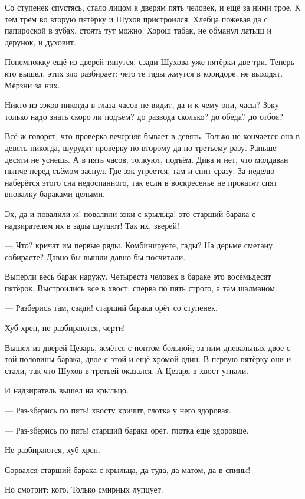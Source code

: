 Со ступенек спустясь, стало лицом к дверям пять человек, и ещё за ними трое. К тем трём во
вторую пятёрку и Шухов пристроился. Хлебца пожевав да с папироской в зубах, стоять тут можно.
Хорош табак, не обманул латыш \dash и дерунок, и духовит.

Понемножку ещё из дверей тянутся, сзади Шухова уже пятёрки две-три. Теперь кто вышел, этих
зло разбирает: чего те гады жмутся в коридоре, не выходят. Мёрзни за них.

Никто из зэков никогда в глаза часов не видит, да и к чему они, часы? Зэку только надо знать \dash
скоро ли подъём? до развода сколько? до обеда? до отбоя?

Всё ж говорят, что проверка вечерняя бывает в девять. Только не кончается она в девять
никогда, шурудят проверку по второму да по третьему разу. Раньше десяти не уснёшь. А в пять
часов, толкуют, подъём. Дива и нет, что молдаван нынче перед съёмом заснул. Где зэк угреется,
там и спит сразу. За неделю наберётся этого сна недоспанного, так если в воскресенье не
прокатят \dash спят вповалку бараками целыми.

Эх, да и повалили ж! повалили зэки с крыльца! \dash это старший барака с надзирателем их в зады
шугают! Так их, зверей!

--- Что? \dash кричат им первые ряды. \Dash Комбинируете, гады? На дерьме сметану собираете? Давно бы
вышли \dash давно бы посчитали.

Выперли весь барак наружу. Четыреста человек в бараке \dash это восемьдесят пятёрок.
Выстроились все в хвост, сперва по пять строго, а там \dash шалманом.

--- Разберись там, сзади! \dash старший барака орёт со ступенек.

Хуб хрен, не разбираются, черти!

Вышел из дверей Цезарь, жмётся \dash с понтом больной, за ним дневальных двое с той половины
барака, двое с этой и ещё хромой один. В первую пятёрку они и стали, так что Шухов в третьей
оказался. А Цезаря в хвост угнали.

И надзиратель вышел на крыльцо.

--- Раз-зберись по пять! \dash хвосту кричит, глотка у него здоровая.

--- Раз-зберись по пять! \dash старший барака орёт, глотка ещё здоровше.

Не разбираются, хуб хрен.

Сорвался старший барака с крыльца, да туда, да матом, да в спины!

Но \dash смотрит: кого. Только смирных лупцует.

